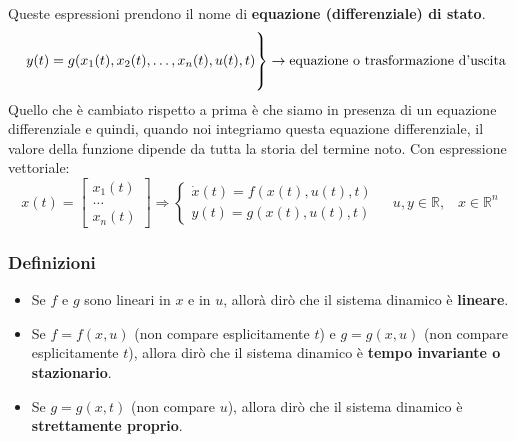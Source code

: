 Queste espressioni prendono il nome di \textbf{equazione (differenziale) di stato}.
\[
    \begin{rcases}
        \\
        \;\;\;\; y(t) = g(x_1(t),x_2(t), \dots, x_n(t), u(t), t)\\
        \\
    \end{rcases} \rightarrow \text{equazione o trasformazione d'uscita}\;
\]
Quello che è cambiato rispetto a prima è che siamo in presenza di un equazione differenziale e quindi, quando noi integriamo questa equazione differenziale, il valore della funzione dipende da tutta la storia del termine noto.\newline
Con espressione vettoriale:
\[
    x(t) = \left[\begin{matrix}
        x_1(t)\\
        \dots\\
        x_n(t)
    \end{matrix}\right] \Rightarrow  \begin{cases}
        \dot{x}(t) = f(x(t), u(t),t)\\
        y(t) = g(x(t),u(t),t)
    \end{cases} \;\;\;\;u,y \in \mathbb{R}, \;\;\;x \in \mathbb{R}^n
\]
\subsubsection{Definizioni}
\begin{itemize}
    \item Se $f$ e $g$ sono lineari in $x$ e in $u$, allorà dirò che il sistema dinamico è \textbf{lineare}.
    \item Se $f = f(x,u)$ (non compare esplicitamente $t$) e $g = g(x,u)$ (non compare esplicitamente $t$), allora dirò che il sistema dinamico è \textbf{tempo invariante o stazionario}.
    \item Se $g = g(x,t)$ (non compare $u$), allora dirò che il sistema dinamico è \textbf{strettamente proprio}.
\end{itemize}
